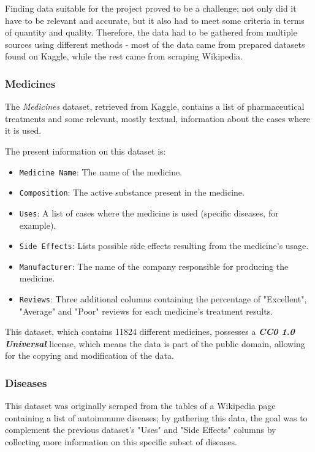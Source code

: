 \documentclass[sigconf]{acmart}
\begin{document}
Finding data suitable for the project proved to be a challenge; not only did it have to be relevant and accurate, but it also had to meet some criteria in terms of quantity and quality. Therefore, the data had to be gathered from multiple sources using different methods - most of the data came from prepared datasets found on Kaggle\cite{kaggle}, while the rest came from scraping Wikipedia\cite{wikipedia}.

\subsubsection{Medicines}

The \textit{Medicines} dataset\cite{medicines_dataset}, retrieved from Kaggle, contains a list of pharmaceutical treatments and some relevant, mostly textual, information about the cases where it is used.

The present information on this dataset is:
\begin{itemize}
	\item {\texttt{Medicine Name}}: The name of the medicine.
	\item {\texttt{Composition}}: The active substance present in the medicine.
	\item {\texttt{Uses}}: A list of cases where the medicine is used (specific diseases, for example).
	\item {\texttt{Side Effects}}: Lists possible side effects resulting from the medicine's usage.
	\item {\texttt{Manufacturer}}: The name of the company responsible for producing the medicine.
	\item {\texttt{Reviews}}: Three additional columns containing the percentage of "Excellent", "Average" and "Poor" reviews for each medicine's treatment results.
\end{itemize}

This dataset, which contains 11824 different medicines, possesses a {\textit{\textbf{CC0 1.0 Universal}}}\cite{cczero} license, which means the data is part of the public domain, allowing for the copying and modification of the data.

\subsubsection{Diseases}

This dataset was originally scraped from the tables of a Wikipedia page containing a list of autoimmune diseases\cite{diseases_dataset}; by gathering this data, the goal was to complement the previous dataset's "Uses" and "Side Effects" columns by collecting more information on this specific subset of diseases.
\end{document}
